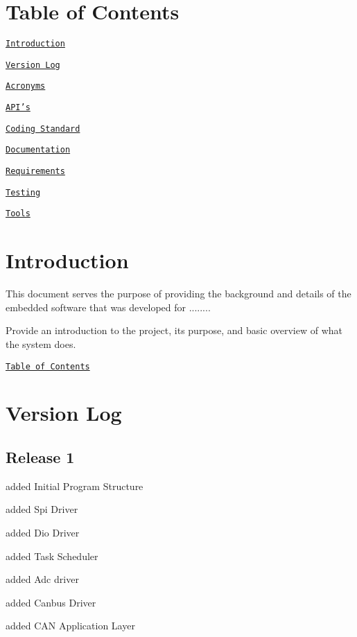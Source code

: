 \label{_Contents}%
 \hypertarget{index_contents_sec}{}\section{Table of Contents}\label{index_contents_sec}
\href{#Introduction}{\tt Introduction}\par
 \href{#VersionLog}{\tt Version Log}\par
 \href{#Acronyms}{\tt Acronyms}\par
 \href{#API}{\tt A\-P\-I's}\par
 \href{#CodingStandard}{\tt Coding Standard}\par
 \href{#Documentation}{\tt Documentation}\par
 \href{#Requirements}{\tt Requirements}\par
 \href{#Testing}{\tt Testing}\par
 \href{#Tools}{\tt Tools}\par






\label{_Introduction}%
 \hypertarget{index_intro_sec}{}\section{Introduction}\label{index_intro_sec}
This document serves the purpose of providing the background and details of the embedded software that was developed for ........

Provide an introduction to the project, its purpose, and basic overview of what the system does.



\par
\href{#Contents}{\tt Table of Contents}\par






\label{_VersionLog}%
\hypertarget{index_Version}{}\section{Version Log}\label{index_Version}
\hypertarget{index_Release1}{}\subsection{Release 1}\label{index_Release1}

\begin{DoxyItemize}
\item added Initial Program Structure
\item added Spi Driver
\item added Dio Driver
\item added Task Scheduler
\item added Adc driver
\item added Canbus Driver
\item added C\-A\-N Application Layer
\end{DoxyItemize}

